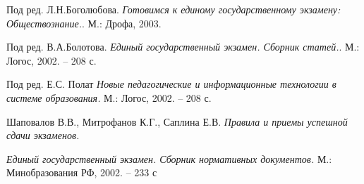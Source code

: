 \begin{thebibliography}{9}

Под ред. Л.Н.Боголюбова.
\textit{Готовимся к единому государственному экзамену: Обществознание.}.
М.: Дрофа, 2003.

Под ред. В.А.Болотова.
\textit{Единый государственный экзамен. Сборник статей.}.
М.: Логос, 2002. – 208 с.

Под ред. Е.С. Полат
\textit{Новые педагогические и информационные технологии в системе
образования.}
М.: Логос, 2002. – 208 с.

Шаповалов В.В., Митрофанов К.Г., Саплина Е.В.
\textit{Правила и приемы успешной сдачи экзаменов.}

\textit{Единый государственный экзамен. Сборник нормативных документов.}
М.: Минобразования РФ, 2002. – 233 с
\end{thebibliography}

